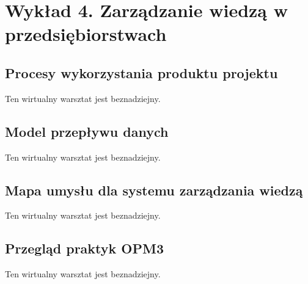 \chapter{Wykład 4. Zarządzanie wiedzą w przedsiębiorstwach}

\section{Procesy wykorzystania produktu projektu}

Ten wirtualny warsztat jest beznadziejny.


\section{Model przepływu danych}

Ten wirtualny warsztat jest beznadziejny.


\section{Mapa umysłu dla systemu zarządzania wiedzą}

Ten wirtualny warsztat jest beznadziejny.


\section{Przegląd praktyk OPM3}

Ten wirtualny warsztat jest beznadziejny.


